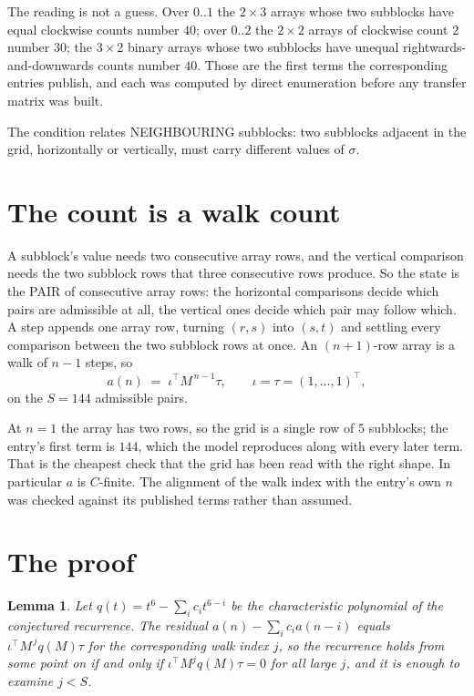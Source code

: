 \documentclass[11pt,a4paper]{article}
\theoremstyle{plain}
\newtheorem{lemma}[theorem]{Lemma}
\theoremstyle{definition}
\begin{document}
The reading is not a guess. Over $0..1$ the $2\times3$ arrays whose two subblocks have equal
clockwise counts number $40$; over $0..2$ the $2\times2$ arrays of clockwise count $2$ number
$30$; the $3\times2$ binary arrays whose two subblocks have unequal rightwards-and-downwards
counts number $40$. Those are the first terms the corresponding entries publish, and each was
computed by direct enumeration before any transfer matrix was built.

The condition relates NEIGHBOURING subblocks: two subblocks adjacent in the grid, horizontally
or vertically, must carry different values of $\sigma$.

\section{The count is a walk count}

A subblock's value needs two consecutive array rows, and the vertical
comparison needs the two subblock rows that three consecutive rows produce. So the state is the
PAIR of consecutive array rows: the horizontal comparisons decide which pairs are admissible at
all, the vertical ones decide which pair may follow which. A step appends one array row,
turning $(r,s)$ into $(s,t)$ and settling every comparison between the two subblock rows at
once. An $(n+1)$-row array is a walk of $n-1$ steps, so
\[
a(n)\;=\;\iota^{\!\top}M^{\,n-1}\tau,\qquad\iota=\tau=(1,\dots,1)^{\!\top},
\]
on the $S=144$ admissible pairs.

At $n=1$ the array has two rows, so the grid is a single row of $5$
subblocks; the entry's first term is $144$, which the model
reproduces along with every later term. That is the cheapest check that the grid has been read
with the right shape.
In particular $a$ is $C$-finite. The alignment of the walk index with the entry's own $n$ was
checked against its published terms rather than assumed.

\section{The proof}

\begin{lemma}\label{lem:crit}
Let $q(t)=t^{6}-\sum_i c_it^{6-i}$ be the characteristic polynomial of the
conjectured recurrence. The residual $a(n)-\sum_ic_ia(n-i)$ equals
$\iota^{\!\top}M^{\,j}q(M)\tau$ for the corresponding walk index $j$, so the recurrence
holds from some point on if and only if $\iota^{\!\top}M^{j}q(M)\tau=0$ for all large $j$,
and it is enough to examine $j<S$.
\end{lemma}
\end{document}
